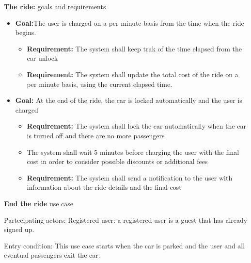 \documentclass{beamer}
\begin{document}
	\begin{frame} {\textbf{The ride:} goals and requirements}
		
			\begin{itemize}
				\item \textbf{Goal:}The user is charged on a per minute basis from the time when the ride begins.\\
				
				\begin{itemize}
					\item \textbf{Requirement:} The system shall keep trak of the time elapsed from the car unlock
					\item \textbf{Requirement:} The system shall update the total cost of the ride on a per minute basis, using the current elapsed time.
				\end{itemize}
				\item \textbf{Goal:} At the end of the ride, the car is locked automatically and the user is charged\\

				\begin{itemize}
					\item \textbf{Requirement:} The system shall lock the car automatically when the car is turned off and there are no more passengers
					\item The system shall wait 5 minutes before charging the user with the final cost in order to consider possible discounts or additional fees
					\item \textbf{Requirement:} The system shall send a notification to the user with information about the ride details and the final cost
				\end{itemize}
			\end{itemize}
	\end{frame}

	\begin{frame}{\textbf{End the ride} use case}
		\begin{block}{Partecipating actors:}
			Registered user: a registered user is a guest that has already signed up.
		\end{block}
		\begin{block}{Entry condition:}
			This use case starts when the car is parked and the user and all eventual passengers exit the car.
		\end{block}
	\end{frame}
	
\end{document}
